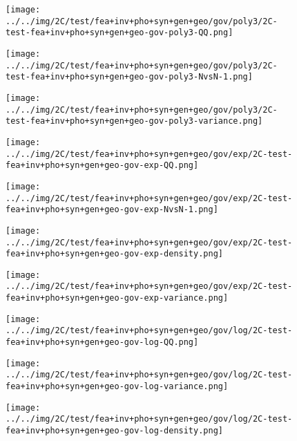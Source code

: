 \begin{figure}[H]
\centering	\texttt{[image: ../../img/2C/test/fea+inv+pho+syn+gen+geo/gov/poly3/2C-test-fea+inv+pho+syn+gen+geo-gov-poly3-QQ.png]}
\end{figure}
\begin{figure}[H]
\centering	\texttt{[image: ../../img/2C/test/fea+inv+pho+syn+gen+geo/gov/poly3/2C-test-fea+inv+pho+syn+gen+geo-gov-poly3-NvsN-1.png]}
\end{figure}
\begin{figure}[H]
\centering	\texttt{[image: ../../img/2C/test/fea+inv+pho+syn+gen+geo/gov/poly3/2C-test-fea+inv+pho+syn+gen+geo-gov-poly3-variance.png]}
\end{figure}
\begin{figure}[H]
\centering	\texttt{[image: ../../img/2C/test/fea+inv+pho+syn+gen+geo/gov/exp/2C-test-fea+inv+pho+syn+gen+geo-gov-exp-QQ.png]}
\end{figure}
\begin{figure}[H]
\centering	\texttt{[image: ../../img/2C/test/fea+inv+pho+syn+gen+geo/gov/exp/2C-test-fea+inv+pho+syn+gen+geo-gov-exp-NvsN-1.png]}
\end{figure}
\begin{figure}[H]
\centering	\texttt{[image: ../../img/2C/test/fea+inv+pho+syn+gen+geo/gov/exp/2C-test-fea+inv+pho+syn+gen+geo-gov-exp-density.png]}
\end{figure}
\begin{figure}[H]
\centering	\texttt{[image: ../../img/2C/test/fea+inv+pho+syn+gen+geo/gov/exp/2C-test-fea+inv+pho+syn+gen+geo-gov-exp-variance.png]}
\end{figure}
\begin{figure}[H]
\centering	\texttt{[image: ../../img/2C/test/fea+inv+pho+syn+gen+geo/gov/log/2C-test-fea+inv+pho+syn+gen+geo-gov-log-QQ.png]}
\end{figure}
\begin{figure}[H]
\centering	\texttt{[image: ../../img/2C/test/fea+inv+pho+syn+gen+geo/gov/log/2C-test-fea+inv+pho+syn+gen+geo-gov-log-variance.png]}
\end{figure}
\begin{figure}[H]
\centering	\texttt{[image: ../../img/2C/test/fea+inv+pho+syn+gen+geo/gov/log/2C-test-fea+inv+pho+syn+gen+geo-gov-log-density.png]}
\end{figure}
